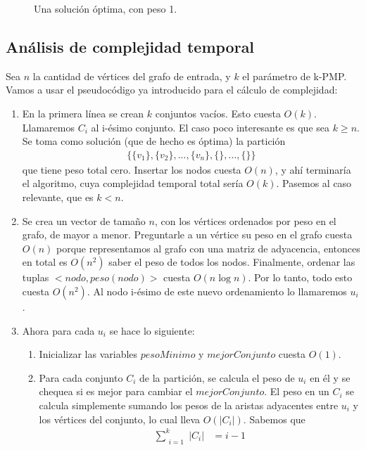 \begin{figure}[H]
\begin{minipage}[t]{0.5\linewidth}
		\caption{Una solución óptima, con peso 1.}
		\label{fig:ej3_rotura_optima}
	\end{minipage}
\end{figure}

\subsection{Análisis de complejidad temporal}

Sea $n$ la cantidad de vértices del grafo de entrada, y $k$ el parámetro de k-PMP. Vamos a usar el pseudocódigo ya introducido para el cálculo de complejidad:
\begin{enumerate}
    \item En la primera línea se crean $k$ conjuntos vacíos. Esto cuesta $O(k)$. Llamaremos $C_i$ al i-ésimo conjunto. El caso poco interesante es que sea $k \geq n$. Se toma como solución (que de hecho es óptima) la partición 
    \begin{align*}
    \{\{v_1\}, \{v_2\}, ..., \{v_n\}, \{\}, ..., \{\}\}
    \end{align*}
    que tiene peso total cero. Insertar los nodos cuesta $O(n)$, y ahí terminaría el algoritmo, cuya complejidad temporal total sería $O(k)$. Pasemos al caso relevante, que es $k < n$.
    \item Se crea un vector de tamaño $n$, con los vértices ordenados por peso en el grafo, de mayor a menor. Preguntarle a un vértice su peso en el grafo cuesta $O(n)$ porque representamos al grafo con una matriz de adyacencia, entonces en total es $O(n^2)$ saber el peso de todos los nodos. Finalmente, ordenar las tuplas $<nodo,peso(nodo)>$ cuesta $O(n \log n)$. Por lo tanto, todo esto cuesta $O(n^2)$. Al nodo i-ésimo de este nuevo ordenamiento lo llamaremos $u_i$.
    \item Ahora para cada $u_i$ se hace lo siguiente:
        \begin{enumerate}
            \item Inicializar las variables $pesoMinimo$ y $mejorConjunto$ cuesta $O(1)$.
            \item Para cada conjunto $C_i$ de la partición, se calcula el peso de $u_i$ en él y se chequea si es mejor para cambiar el $mejorConjunto$. El peso en un $C_i$ se calcula simplemente sumando los pesos de la aristas adyacentes entre $u_i$ y los vértices del conjunto, lo cual lleva $O(|C_i|)$. Sabemos que
            \begin{align*}
                \sum\limits_{\substack{i = 1}}^k |C_i| &= i - 1

\end{align*}
\end{enumerate}
\end{enumerate}
